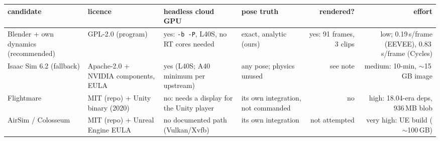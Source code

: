 \begin{tabular}{p{2.4cm}p{1.5cm}p{2.4cm}p{2.2cm}rr}
\toprule
candidate & licence & headless cloud GPU & pose truth & rendered? & effort \\
\midrule
Blender + own dynamics (recommended)
  & GPL-2.0 (program)
  & yes: \texttt{-b -P}, L40S, no RT cores needed
  & exact, analytic (ours)
  & yes: 91 frames, 3 clips
  & low; 0.19\,s/frame (EEVEE), 0.83\,s/frame (Cycles) \\
Isaac Sim 6.2 (fallback)
  & Apache-2.0 + NVIDIA components, EULA
  & yes (L40S; A40 minimum per upstream)
  & any pose; physics unused
  & see note
  & medium: 10-min, $\sim$15\,GB image \\
Flightmare
  & MIT (repo) + Unity binary (2020)
  & no: needs a display for the Unity player
  & its own integration, not commanded
  & no
  & high: 18.04-era deps, 936\,MB blob \\
AirSim / Colosseum
  & MIT (repo) + Unreal Engine EULA
  & no documented path (Vulkan/Xvfb)
  & its own integration
  & not attempted
  & very high: UE build ($\sim$100\,GB) \\
\bottomrule
\end{tabular}
